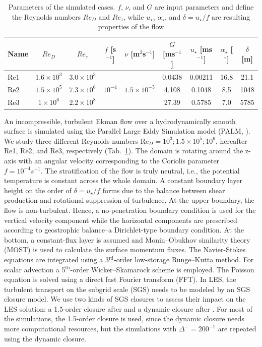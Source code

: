 \documentclass[a4paper,11pt]{article}
\begin{document}
\begin{table}
	\centering
	\caption{Parameters of the simulated cases. $f$, $\nu$, and $G$ are input parameters and define the Reynolds numbers $Re_D$ and $Re_\tau$, while $u_\star$, $\alpha_\star$, and $\delta = u_\star/f$ are resulting properties of the flow}
	\begin{tabular}{lcccccccc}
          \toprule  
	  Name & $Re_D$ & $Re_\tau$ & $f$ [s$^{-1}$] & $\nu$ [m$^2$s$^{-1}$] & $G$ [ms$^{-1}$] & $u_\star$ [ms$^{-1}$] & $\alpha_\star$ [$^\circ$]& $\delta$ [m] \\
          \midrule
	  Re1 & $1.6\times10^3$ & $3.0\times10^3$ &  &  & 0.0438 & 0.00211 & 16.8 & 21.1 \\
	  Re2 & $1.5\times10^5$ & $7.3\times10^6$ & $10^{-4}$ & $1.5\times10^{-5}$ & 4.108 & 0.1048 & 8.5 & 1048\\
	  Re3 & $1\times10^6$ & $2.2\times10^8$ &  &  & 27.39 & 0.5785 & 7.0 & 5785 \\
          \bottomrule
	\end{tabular}
	\label{simulation_parameters}
\end{table}
An incompressible, turbulent Ekman flow over a hydrodynamically smooth surface is simulated using the Parallel Large Eddy Simulation model (PALM, \citealp{maronga2020overview}). We study three different Reynolds numbers Re$_D = 10^3;1.5\times 10^5;10^6$, hereafter Re1, Re2, and Re3, respectively (Tab.~\ref{simulation_parameters}).
%
The domain is rotating around the z-axis with an angular velocity corresponding to the Coriolis parameter $f=10^{-4}s^{-1}$. The stratification of the flow is truly neutral, i.e., the potential temperature is constant across the whole domain. A constant boundary layer height on the order of $\delta=u_\star/f$ forms due to the balance between shear production and rotational suppression of turbulence. At the upper boundary, the flow is non-turbulent. Hence, a no-penetration boundary condition is used for the vertical velocity component while the horizontal components are prescribed according to geostrophic balance--a Dirichlet-type boundary condition. At the bottom, a constant-flux layer is assumed and Monin--Obukhov similarity theory (MOST) is used to calculate the surface momentum fluxes. The Navier-Stokes equations are integrated using a 3$^\text{rd}$-order low-storage Runge--Kutta method. For scalar advection a 5$^\text{th}$-order Wicker--Skamarock scheme is employed. The Poisson equation is solved using a direct fast Fourier transform (FFT). In LES, the turbulent transport on the subgrid scale (SGS) needs to be modeled by an SGS closure model. We use two kinds of SGS closures to assess their impact on the LES solution: a 1.5-order closure after \cite{deardorff1980stratocumulus} and a dynamic closure after \cite{heinz2008realizability}. For most of the simulations, the 1.5-order closure is used, since the dynamic closure needs more computational resources, but the simulations with $\Delta^-=200^{-1}$ are repeated using the dynamic closure.  
\end{document}
